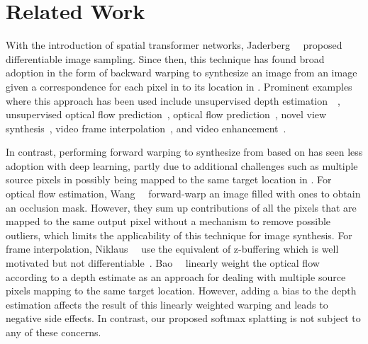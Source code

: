 \documentclass[10pt,twocolumn,letterpaper]{article}
\begin{document}
\section{Related Work}
\label{sec:related}
With the introduction of spatial transformer networks, Jaderberg~\etal~\cite{Jaderberg_NIPS_2015} proposed differentiable image sampling. Since then, this technique has found broad adoption in the form of backward warping to synthesize an image  from an image  given a correspondence  for each pixel in  to its location in . Prominent examples where this approach has been used include unsupervised depth estimation~~\cite{Godard_CVPR_2017, Mahjourian_CVPR_2018, Zhou_CVPR_2017}, unsupervised optical flow prediction~\cite{Meister_AAAI_2018, Wang_CVPR_2018, Yu_OTHER_2016}, optical flow prediction~\cite{Hui_CVPR_2018, Ranjan_CVPR_2017, Sun_CVPR_2018}, novel view synthesis~\cite{Cun_OTHER_2019, Liu_CVPR_2018, Zhou_ECCV_2016}, video frame interpolation~\cite{Bao_CVPR_2019, Jiang_CVPR_2018, Liu_AAAI_2019, Liu_ICCV_2017}, and video enhancement~\cite{Caballero_CVPR_2017, Tao_ICCV_2017, Xue_IJCV_2019}.

In contrast, performing forward warping to synthesize  from  based on  has seen less adoption with deep learning, partly due to additional challenges such as multiple source pixels in  possibly being mapped to the same target location in . For optical flow estimation, Wang~\etal~\cite{Wang_CVPR_2018} forward-warp an image filled with ones to obtain an occlusion mask. However, they sum up contributions of all the pixels that are mapped to the same output pixel without a mechanism to remove possible outliers, which limits the applicability of this technique for image synthesis. For frame interpolation, Niklaus~\etal~\cite{Niklaus_CVPR_2018} use the equivalent of z-buffering which is well motivated but not differentiable~\cite{Nguyen_NIPS_2018}. Bao~\etal~\cite{Bao_CVPR_2019} linearly weight the optical flow according to a depth estimate as an approach for dealing with multiple source pixels mapping to the same target location. However, adding a bias to the depth estimation affects the result of this linearly weighted warping and leads to negative side effects. In contrast, our proposed softmax splatting is not subject to any of these concerns.
\end{document}
